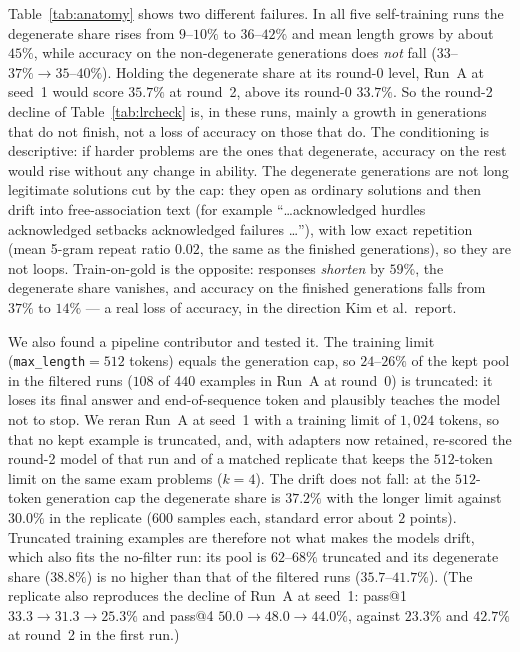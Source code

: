 \documentclass[runningheads]{llncs}
\begin{document}
Table~\ref{tab:anatomy} shows two different failures. In all five self-training
runs the degenerate share rises from $9$--$10\%$ to $36$--$42\%$ and mean length
grows by about $45\%$, while accuracy on the non-degenerate generations does
\emph{not} fall ($33$--$37\%\to35$--$40\%$). Holding the degenerate share at
its round-0 level, Run~A at seed~1 would score $35.7\%$ at round~2, above its
round-0 $33.7\%$. So the round-2 decline of Table~\ref{tab:lrcheck} is, in these
runs, mainly a growth in generations that do not finish, not a loss of accuracy
on those that do. The conditioning is descriptive: if harder problems are the
ones that degenerate, accuracy on the rest would rise without any change in
ability. The degenerate generations are not long legitimate solutions cut by
the cap: they open as ordinary solutions and then drift into free-association
text (for example ``\ldots acknowledged hurdles acknowledged setbacks acknowledged
failures \ldots''), with low exact repetition (mean 5-gram repeat ratio $0.02$,
the same as the finished generations), so they are not loops. Train-on-gold is
the opposite: responses \emph{shorten} by $59\%$, the degenerate share vanishes,
and accuracy on the finished generations falls from $37\%$ to $14\%$ --- a real
loss of accuracy, in the direction Kim et al.\ report.

We also found a pipeline contributor and tested it. The training limit
(\texttt{max\_length}$=512$ tokens) equals the generation cap, so $24$--$26\%$ of
the kept pool in the filtered runs ($108$ of $440$ examples in Run~A at
round~0) is truncated: it loses its final answer and end-of-sequence token and
plausibly teaches the model not to stop. We reran Run~A at seed~1 with a
training limit of $1{,}024$ tokens, so that no kept example is truncated, and,
with adapters now retained, re-scored the round-2 model of that run and of a
matched replicate that keeps the $512$-token limit on the same exam problems
($k=4$). The drift does not fall: at the $512$-token generation cap the
degenerate share is $37.2\%$ with the longer limit against $30.0\%$ in the
replicate ($600$ samples each, standard error about $2$ points). Truncated
training examples are therefore not what makes the models drift, which also
fits the no-filter run: its pool is $62$--$68\%$ truncated and its degenerate
share ($38.8\%$) is no higher than that of the filtered runs ($35.7$--$41.7\%$).
(The replicate also reproduces the decline of Run~A at seed~1:
pass@1 $33.3\to31.3\to25.3\%$ and pass@4 $50.0\to48.0\to44.0\%$, against
$23.3\%$ and $42.7\%$ at round~2 in the first run.)
\end{document}
